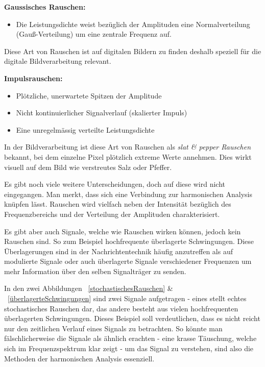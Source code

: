\begin{definition}{\bf Gaussisches Rauschen:}
	\begin{itemize}
		\item Die Leistungsdichte weist bezüglich der Amplituden eine Normalverteilung (Gauß-Verteilung) um eine zentrale Frequenz auf.
	\end{itemize}
Diese Art von Rauschen ist auf digitalen Bildern zu finden deshalb speziell für die digitale Bildverarbeitung relevant. 
\end{definition}

\begin{definition}{\bf Impulsrauschen:}
	\begin{itemize}
		\item Plötzliche, unerwartete Spitzen der Amplitude 
		\item Nicht kontinuierlicher Signalverlauf (skalierter Impuls)
		\item Eine unregelmässig verteilte Leistungsdichte
	\end{itemize}
In der Bildverarbeitung ist diese Art von Rauschen als \textit{slat \& pepper Rauschen} bekannt, bei dem einzelne Pixel plötzlich extreme Werte annehmen. Dies wirkt visuell auf dem Bild wie verstreutes Salz oder Pfeffer.
\end{definition}

Es gibt noch viele weitere Unterscheidungen, doch auf diese wird nicht eingegangen. Man merkt, dass sich eine Verbindung zur harmonischen Analysis knüpfen lässt. Rauschen wird vielfach neben der Intensität bezüglich des Frequenzbereichs und der Verteilung der Amplituden charakterisiert.


Es gibt aber auch Signale, welche wie Rauschen wirken können, jedoch kein Rauschen sind. So zum Beispiel hochfrequente überlagerte Schwingungen. Diese Überlagerungen sind in der Nachrichtentechnik häufig anzutreffen als auf modulierte Signale oder auch überlagerte Signale verschiedener Frequenzen um mehr Information über den selben Signalträger zu senden.
 
 
In den zwei Abbildungen ~\ref{stochastischesRauschen} \& ~\ref{überlagerteSchwingungen} sind zwei Signale aufgetragen - eines stellt echtes stochastisches Rauschen dar, das andere besteht aus vielen hochfrequenten überlagerten Schwingungen. Dieses Beispiel soll verdeutlichen, dass es nicht reicht nur den zeitlichen Verlauf eines Signals zu betrachten. So könnte man fälschlicherweise die Signale als ähnlich erachten - eine krasse Täuschung, welche sich im Frequenzspektrum klar zeigt - um das Signal zu verstehen, sind also die Methoden  der harmonischen Analysis essenziell. 


